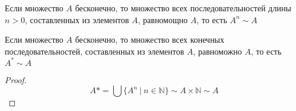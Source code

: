 \begin{corol}
Если множество $A$ бесконечно, то множество всех последовательностей длины $n > 0$, составленных из элементов $A$, равномощно $A$, то есть $A^n \sim A$
\end{corol}
\begin{corol}
Если множество $A$ бесконечно, то множество всех конечных последовательностей, составленных из элементов $A$, равноможно $A$, то есть $A^* \sim A$
\end{corol}
\begin{proof}
$$
A* = \bigcup\{A^n\ |\ n \in \mathbb{N}\} \sim A \times \mathbb{N} \sim A
$$
\end{proof}